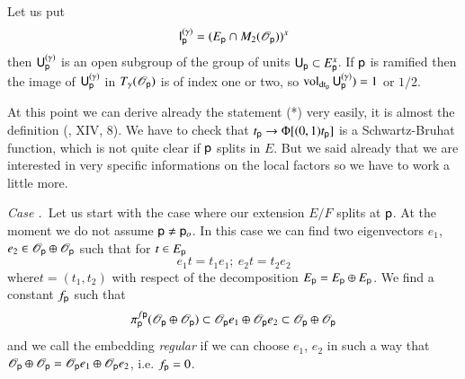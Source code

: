 Let us put
$$
\mathsf{I}^{(\gamma)}_{\mathsf{p}}=(E_{\mathsf{p}}\cap M_{2}(\mathscr{O}_{\mathsf{p}}))^{x}
$$
then $\mathsf{U}^{(\gamma)}_{\mathsf{p}}$ is an open subgroup of the group of units $\mathsf{U}_{\mathsf{p}}\subset E^{x}_{\mathsf{p}}$. If $\mathsf{p}$ is ramified then the image of $\mathsf{U}^{(\gamma)}_{\mathsf{p}}$ in $T_{\gamma}(\mathscr{O}_{\mathsf{p}})$ is of index one or two, so $\operatorname{vol}_{\operatorname{dt}_{\mathsf{p}}}\mathsf{U}^{(\gamma)}_{\mathsf{p}})=1$ or $1/2$.

\begin{remark*}
At this point we can derive already the statement (*) very easily, it is almost the definition (\cite{art2-key12}, XIV, 8). We have to check that $t_{\mathsf{p}}\to \Phi[(0,1)t_{\mathsf{p}}]$ is a Schwartz-Bruhat function, which is not quite clear if $\mathsf{p}$ splits in $E$. But we said already that we are interested in very specific informations on the local factors so we have to work a little more.
\end{remark*}

\medskip
\noindent
{\em Case .\label{art2-case-I}}~Let us start with the case where our extension $E/F$ splits at $\mathsf{p}$. At the moment we do not assume $\mathsf{p}\neq \mathsf{p}_{o}$. In this case we can find two eigenvectors $e_{1}$, $e_{2}\in \mathscr{O}_{\mathsf{p}}\oplus \mathscr{O}_{\mathsf{p}}$ such that for $t\in E_{\mathsf{p}}$
$$
e_{1}t=t_{1}e_{1}; \ e_{2}t=t_{2}e_{2}
$$
where\pageoriginale $t=(t_{1},t_{2})$ with respect of the decomposition $E_{\mathsf{p}}=E_{\mathsf{p}}\oplus E_{\mathsf{p}}$. We find a constant $f_{\mathsf{p}}$ such that
$$
\pi^{f\mathsf{p}}_{\mathsf{p}}(\mathscr{O}_{\mathsf{p}}\oplus \mathscr{O}_{\mathsf{p}})\subset \mathscr{O}_{\mathsf{p}}e_{1}\oplus\mathscr{O}_{\mathsf{p}}e_{2}\subset \mathscr{O}_{\mathsf{p}}\oplus \mathscr{O}_{\mathsf{p}}
$$
and we call the embedding {\em regular} if we can choose $e_{1}$, $e_{2}$ in such a way that $\mathscr{O}_{\mathsf{p}}\oplus \mathscr{O}_{\mathsf{p}}=\mathscr{O}_{\mathsf{p}}e_{1}\oplus \mathscr{O}_{\mathsf{p}}e_{2}$, i.e. $f_{\mathsf{p}}=0$.

